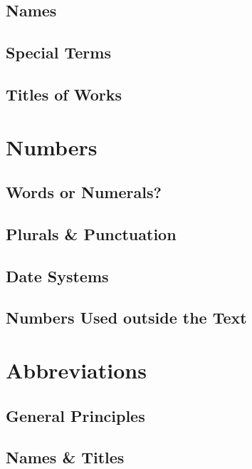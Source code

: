 \documentclass[oneside]{book}
\numberwithin{equation}{section}
\begin{document}
\section{Names}

\section{Special Terms}

\section{Titles of Works}


\chapter{Numbers}

\section{Words or Numerals?}

\section{Plurals \& Punctuation}

\section{Date Systems}

\section{Numbers Used outside the Text}


\chapter{Abbreviations}

\section{General Principles}

\section{Names \& Titles}
\end{document}
